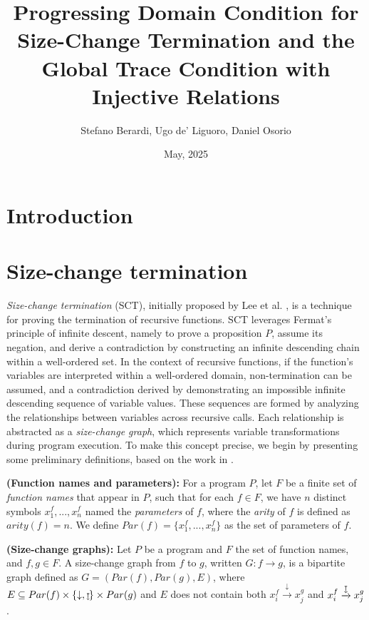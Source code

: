 \documentclass{article}
\title{Progressing Domain Condition for Size-Change Termination and the Global Trace Condition with Injective Relations}
\author{Stefano Berardi, Ugo de' Liguoro, Daniel Osorio}
\date{May, 2025}
\begin{document}
\maketitle

\section{Introduction}

\section{Size-change termination}
\emph{Size-change termination} (SCT), initially proposed by Lee et al. \cite{Lee1}, is a technique for proving the termination of recursive functions. SCT leverages Fermat's principle of infinite descent, namely to prove a proposition $P$, assume its negation, and derive a contradiction by constructing an infinite descending chain within a well-ordered set. In the context of recursive functions, if the function's variables are interpreted within a well-ordered domain, non-termination can be assumed, and a contradiction derived by demonstrating an impossible infinite descending sequence of variable values. These sequences are formed by analyzing the relationships between variables across recursive calls. Each relationship is abstracted as a \emph{size-change graph}, which represents variable transformations during program execution. To make this concept precise, we begin by presenting some preliminary definitions, based on the work in \cite{Lee1, Mirai}.

\begin{definition}
    \textbf{(Function names and parameters):}
    For a program $P$, let $F$ be a finite set of \emph{function names} that appear in $P$, such that for each $f \in F$, we have $n$ distinct symbols $x_1^f,...,x_n^f$ named the \emph{parameters} of $f$, where the \emph{arity} of $f$ is defined as $arity(f) = n$. We define $Par(f) = \{x_1^f,...,x_n^f \}$ as the set of parameters of $f$.
\end{definition}

\begin{definition}
    \textbf{(Size-change graphs):} Let $P$ be a program and $F$ the set of function names, and $f,g \in F$. A size-change graph from $f$ to $g$, written $G: f \rightarrow g$, is a bipartite graph defined as $G = (Par(f), Par(g), E)$, where $E \subseteq Par(f) \times \{ \downarrow, \downmapsto \} \times Par(g) $ and $E$ does not contain both $x_i^f \xrightarrow{\downarrow} x_j^g$ and $x_i^f \xrightarrow{\downmapsto} x_j^g$.  
\end{definition}
\end{document}
